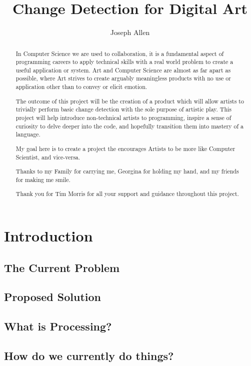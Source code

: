 \documentclass[a4paper]{report}
\title{Change Detection for Digital Art}
\author{Joseph Allen}
\begin{document}
\maketitle

\begin{abstract}
In Computer Science we are used to collaboration, it is a fundamental aspect of programming careers to apply technical skills with a real world problem to create a useful application or system. Art and Computer Science are almost as far apart as possible, where Art strives to create arguably meaningless products with no use or application other than to convey or elicit emotion. 

The outcome of this project will be the creation of a product which will allow artists to trivially perform basic change detection with the sole purpose of artistic play. This project will help introduce non-technical artists to programming, inspire a sense of curiosity to delve deeper into the code, and hopefully transition them into mastery of a language.

My goal here is to create a project the encourages Artists to be more like Computer Scientist, and vice-versa.
\end{abstract}

\renewcommand{\abstractname}{Acknowledgements}
\begin{abstract}
Thanks to my Family for carrying me, Georgina for holding my hand, and my friends for making me smile.

Thank you for Tim Morris for all your support and guidance throughout this project.
\end{abstract}

\tableofcontents

\section{Introduction}
\subsection{The Current Problem}
\subsection{Proposed Solution}
\subsection{What is Processing?}
\subsection{How do we currently do things?}
\end{document}
